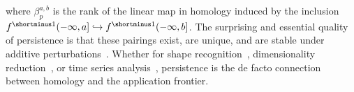 \documentclass[10pt]{article}
\numberwithin{equation}{section}
\newcommand{\+}{%
	\raisebox{0.18ex}{\scaleobj{0.55}{+}}
}
\theoremstyle{definition}
\theoremstyle{definition}
\begin{document}
where $\beta_p^{a,b}$ is the rank of the linear map in homology induced by the inclusion $f^{\shortminus1}(-\infty, a] \hookrightarrow f^{\shortminus1}(-\infty, b]$.
The surprising and essential quality of persistence is that these pairings exist, are unique, and are stable under additive perturbations~\cite{cohen2005stability}.
Whether for shape recognition~\cite{chazal2009gromov}, 
dimensionality reduction~\cite{scoccola2023fibered}, or time series analysis~\cite{perea2016persistent}, persistence is the de facto connection between homology and the application frontier.
\end{document}
